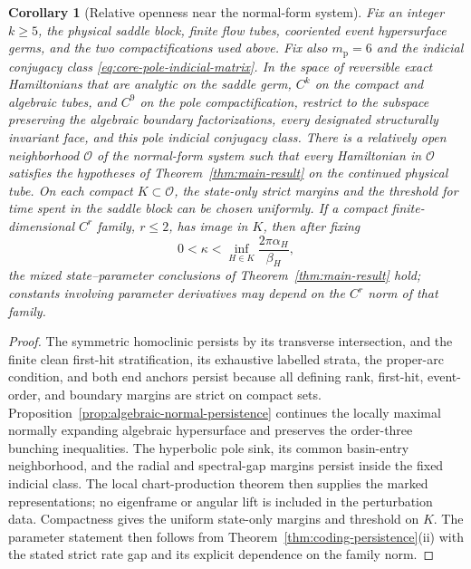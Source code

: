 \documentclass[11pt]{amsart}
\numberwithin{equation}{section}
\newtheorem{corollary}[theorem]{Corollary}
\theoremstyle{definition}
\theoremstyle{remark}
\begin{document}
\begin{corollary}[Relative openness near the normal-form system]
\label{cor:core-relative-open-class}
Fix an integer $k\ge5$, the physical saddle block, finite flow tubes, cooriented event
hypersurface germs, and the two compactifications used above.  Fix also
$m_{\mathrm p}=6$ and the indicial conjugacy class
\eqref{eq:core-pole-indicial-matrix}.  In the space of reversible exact
Hamiltonians that are analytic on the saddle germ, $C^k$ on the compact
and algebraic tubes, and $C^9$ on the pole compactification, restrict to
the subspace preserving the algebraic boundary factorizations, every
designated structurally invariant face, and this pole indicial conjugacy
class.  There is a relatively open neighborhood $\mathcal O$ of the
normal-form system such that every Hamiltonian in $\mathcal O$ satisfies
the hypotheses of Theorem~\ref{thm:main-result} on the continued physical
tube.  On each compact $K\subset\mathcal O$, the state-only strict margins
and the threshold for time spent in the saddle block can be chosen
uniformly.  If a compact finite-dimensional $C^r$ family, $r\le2$, has
image in $K$, then after fixing
\[
 0<\kappa<\inf_{H\in K}\frac{2\pi\alpha_H}{\beta_H},
\]
the mixed state--parameter conclusions of
Theorem~\ref{thm:main-result} hold; constants involving parameter
derivatives may depend on the $C^r$ norm of that family.
\end{corollary}

\begin{proof}
The symmetric homoclinic persists by its transverse intersection, and the
finite clean first-hit stratification, its exhaustive labelled strata, the
proper-arc condition, and both end anchors persist because all defining
rank, first-hit, event-order, and boundary margins are strict on compact
sets.  Proposition~\ref{prop:algebraic-normal-persistence} continues the
locally maximal normally expanding algebraic hypersurface and preserves
the order-three bunching inequalities.  The hyperbolic pole sink, its
common basin-entry neighborhood, and the radial and spectral-gap margins
persist inside the fixed indicial class.  The local chart-production
theorem then supplies the marked representations; no eigenframe or angular
lift is included in the perturbation data.  Compactness gives the uniform
state-only margins and threshold on $K$.  The parameter statement then
follows from Theorem~\ref{thm:coding-persistence}\textup{(ii)} with the
stated strict rate gap and its explicit dependence on the family norm.
\end{proof}
\end{document}
